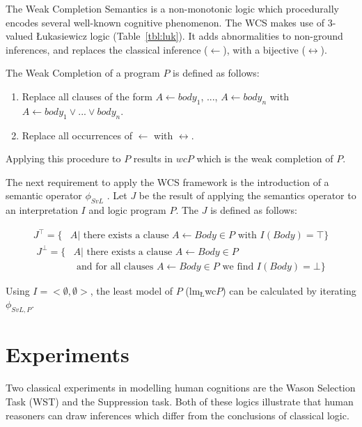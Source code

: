 \documentclass{article}
\begin{document}
The Weak Completion Semantics is a non-monotonic logic which procedurally encodes several well-known cognitive phenomenon. The WCS makes use of 3-valued \L ukasiewicz logic (Table~\ref{tbl:luk}). It adds abnormalities to non-ground inferences, and replaces the classical inference ($\leftarrow$), with a bijective ($\leftrightarrow$). 

The Weak Completion of a program $P$ is defined as follows:

\begin{enumerate}
\item Replace all clauses of the form $A \leftarrow body_1$, ..., $A \leftarrow body_n$ with $A \leftarrow body_1 \lor ... \lor body_n$.
\item Replace all occurrences of $\leftarrow$ with $\leftrightarrow$.
\end{enumerate}

Applying this procedure to $P$ results in $wcP$ which is the weak completion of $P$.

The next requirement to apply the WCS framework is the introduction of a semantic operator $\phi_{SvL}$ \citep{stenning2008interpretation}. Let $J$ be the result of applying the semantics operator to an interpretation $I$ and logic program $P$. The $J$ is defined as follows:

\[
\begin{split}
J^\top = \{ & A | \textrm{ there exists a clause } A\leftarrow Body \in P \textrm{ with } I(Body) = \top\}
\end{split}
\]
\[
\begin{split}
J^\bot = \{ &  A | \textrm{ there exists a clause } A \leftarrow Body \in P \\
           & \textrm{ and for all clauses } A \leftarrow Body \in P \textrm{ we find } I(Body) = \bot\}
\end{split}
\]

Using $I=<\emptyset, \emptyset>$, the least model of $P$ ($\textrm{lm}_\textrm{\L}$wc$P$) can be calculated by iterating $\phi_{SvL,P}$.

\section{Experiments}
Two classical experiments in modelling human cognitions are the Wason Selection Task (WST) and the Suppression task. Both of these logics illustrate that human reasoners can draw inferences which differ from the conclusions of classical logic.
\end{document}
